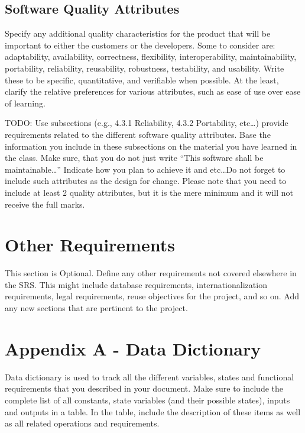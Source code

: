 \documentclass[12 pt, a4paper]{report}
\begin{document}
		\section {Software Quality Attributes}
		Specify any additional quality characteristics for the product that will be important to either the customers or the developers. Some to consider are: adaptability, availability, correctness, flexibility, interoperability, maintainability, portability, reliability, reusability, robustness, testability, and usability. Write these to be specific, quantitative, and verifiable when possible. At the least, clarify the relative preferences for various attributes, such as ease of use over ease of learning. 
		
		TODO: Use subsections (e.g., 4.3.1 Reliability, 4.3.2 Portability, etc…) provide requirements related to the different software quality attributes. Base the information you include in these subsections on the material you have learned in the class. Make sure, that you do not just write “This software shall be maintainable…” Indicate how you plan to achieve it and etc…Do not forget to include such attributes as the design for change. Please note that you need to include at least 2 quality attributes, but it is the mere minimum and it will not receive the full marks.
		
		\chapter {Other Requirements}
		This section is Optional. Define any other requirements not covered elsewhere in the SRS. This might include database requirements, internationalization requirements, legal requirements, reuse objectives for the project, and so on. Add any new sections that are pertinent to the project.
		
		\chapter {Appendix A - Data Dictionary}
		Data dictionary is used to track all the different variables, states and functional requirements that you described in your document. Make sure to include the complete list of all constants, state variables (and their possible states), inputs and outputs in a table. In the table, include the description of these items as well as all related operations and requirements.
		
	
\end{document}
